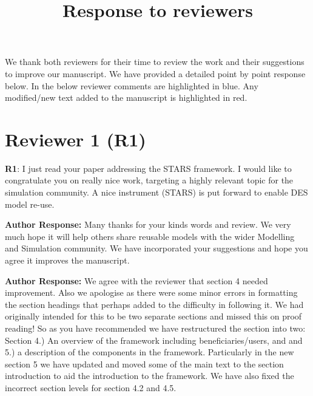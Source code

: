 \documentclass{article}
\title{Response to reviewers}
\date{}
\begin{document}
\maketitle

We thank both reviewers for their time to review the work and their suggestions to improve our manuscript. We have provided a detailed point by point response below.  In the below reviewer comments are highlighted in {\color{blue}blue}.  Any modified/new text added to the manuscript is highlighted in {\color{red}red}.

\section{Reviewer 1 (R1)}

{\color{blue}\textbf{R1}: I just read your paper addressing the STARS framework. I would like to congratulate you on really nice work, targeting a highly relevant topic for the simulation community. A nice instrument (STARS) is put forward to enable DES model re-use.}

\vspace{0.2cm}

\noindent\textbf{Author Response:}  Many thanks for your kinds words and review. We very much hope it will help others share reusable models with the wider Modelling and Simulation community.  We have incorporated your suggestions and hope you agree it improves the manuscript.

\vspace{0.5cm}


\vspace{0.2cm}

\noindent\textbf{Author Response:} We agree with the reviewer that section 4 needed improvement.  Also we apologise as there were some minor errors in formatting the section headings that perhaps added to the difficulty in following it. We had originally intended for this to be two separate sections and missed this on proof reading! So as you have recommended we have restructured the section into two: Section 4.) An overview of the framework including beneficiaries/users, and and 5.) a description of the components in the framework. Particularly in the new section 5 we have updated and moved some of the main text to the section introduction to aid the introduction to the framework.  We have also fixed the incorrect section levels for section 4.2 and 4.5. 
\end{document}

